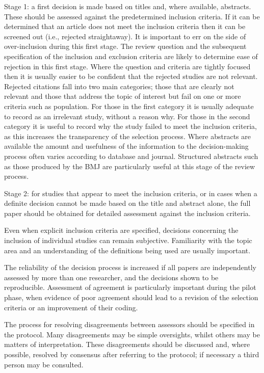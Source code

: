 \documentclass[
  10pt,
  a4paper,
  DIV=11,
  numbers=noendperiod]{scrreprt}
\begin{document}
Stage 1: a first decision is made based on titles and, where available,
abstracts. These should be assessed against the predetermined inclusion
criteria. If it can be determined that an article does not meet the
inclusion criteria then it can be screened out (i.e., rejected
straightaway). It is important to err on the side of over-inclusion
during this first stage. The review question and the subsequent
specification of the inclusion and exclusion criteria are likely to
determine ease of rejection in this first stage. Where the question and
criteria are tightly focused then it is usually easier to be confident
that the rejected studies are not relevant. Rejected citations fall into
two main categories; those that are clearly not relevant and those that
address the topic of interest but fail on one or more criteria such as
population. For those in the first category it is usually adequate to
record as an irrelevant study, without a reason why. For those in the
second category it is useful to record why the study failed to meet the
inclusion criteria, as this increases the transparency of the selection
process. Where abstracts are available the amount and usefulness of the
information to the decision-making process often varies according to
database and journal. Structured abstracts such as those produced by the
BMJ are particularly useful at this stage of the review process.

Stage 2: for studies that appear to meet the inclusion criteria, or in
cases when a definite decision cannot be made based on the title and
abstract alone, the full paper should be obtained for detailed
assessment against the inclusion criteria.

Even when explicit inclusion criteria are specified, decisions
concerning the inclusion of individual studies can remain subjective.
Familiarity with the topic area and an understanding of the definitions
being used are usually important.

The reliability of the decision process is increased if all papers are
independently assessed by more than one researcher, and the decisions
shown to be reproducible. Assessment of agreement is particularly
important during the pilot phase, when evidence of poor agreement should
lead to a revision of the selection criteria or an improvement of their
coding.

The process for resolving disagreements between assessors should be
specified in the protocol. Many disagreements may be simple oversights,
whilst others may be matters of interpretation. These disagreements
should be discussed and, where possible, resolved by consensus after
referring to the protocol; if necessary a third person may be consulted.
\end{document}
